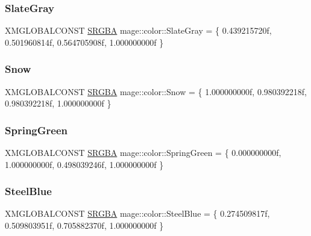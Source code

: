 \hypertarget{namespacemage_1_1color_aaf014e73a6fb5690de0ee9a0f49a7a97}{}\label{namespacemage_1_1color_aaf014e73a6fb5690de0ee9a0f49a7a97} 
\subsubsection{\texorpdfstring{Slate\+Gray}{SlateGray}}
{\footnotesize\ttfamily X\+M\+G\+L\+O\+B\+A\+L\+C\+O\+N\+ST \hyperlink{structmage_1_1_s_r_g_b_a}{S\+R\+G\+BA} mage\+::color\+::\+Slate\+Gray = \{ 0.\+439215720f, 0.\+501960814f, 0.\+564705908f, 1.\+000000000f \}}

\hypertarget{namespacemage_1_1color_a5d87c66b53439e6b08c4f40c522e3552}{}\label{namespacemage_1_1color_a5d87c66b53439e6b08c4f40c522e3552} 
\subsubsection{\texorpdfstring{Snow}{Snow}}
{\footnotesize\ttfamily X\+M\+G\+L\+O\+B\+A\+L\+C\+O\+N\+ST \hyperlink{structmage_1_1_s_r_g_b_a}{S\+R\+G\+BA} mage\+::color\+::\+Snow = \{ 1.\+000000000f, 0.\+980392218f, 0.\+980392218f, 1.\+000000000f \}}

\hypertarget{namespacemage_1_1color_a51f0437c183d7b1488eaaa71f4790b0c}{}\label{namespacemage_1_1color_a51f0437c183d7b1488eaaa71f4790b0c} 
\subsubsection{\texorpdfstring{Spring\+Green}{SpringGreen}}
{\footnotesize\ttfamily X\+M\+G\+L\+O\+B\+A\+L\+C\+O\+N\+ST \hyperlink{structmage_1_1_s_r_g_b_a}{S\+R\+G\+BA} mage\+::color\+::\+Spring\+Green = \{ 0.\+000000000f, 1.\+000000000f, 0.\+498039246f, 1.\+000000000f \}}

\hypertarget{namespacemage_1_1color_a50269302244cbd567048900ee80b9c28}{}\label{namespacemage_1_1color_a50269302244cbd567048900ee80b9c28} 
\subsubsection{\texorpdfstring{Steel\+Blue}{SteelBlue}}
{\footnotesize\ttfamily X\+M\+G\+L\+O\+B\+A\+L\+C\+O\+N\+ST \hyperlink{structmage_1_1_s_r_g_b_a}{S\+R\+G\+BA} mage\+::color\+::\+Steel\+Blue = \{ 0.\+274509817f, 0.\+509803951f, 0.\+705882370f, 1.\+000000000f \}}

